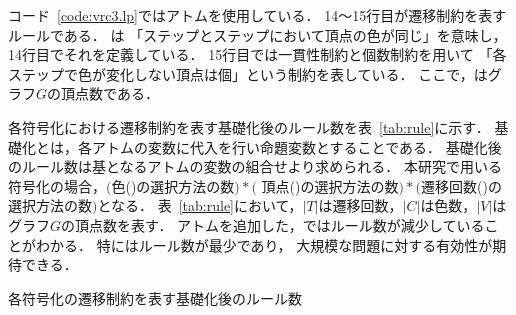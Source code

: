 コード~\ref{code:vrc3.lp}ではアトムを使用している．
14～15行目が遷移制約を表すルールである．
は
「ステップとステップにおいて頂点の色が同じ」を意味し，
14行目でそれを定義している．
15行目では一貫性制約と個数制約を用いて
「各ステップで色が変化しない頂点は個」という制約を表している．
ここで，はグラフ$G$の頂点数である．

各符号化における遷移制約を表す基礎化後のルール数を表~\ref{tab:rule}に示す．
基礎化とは，各アトムの変数に代入を行い命題変数とすることである．
基礎化後のルール数は基となるアトムの変数の組合せより求められる．
本研究で用いる符号化の場合，$($色()の選択方法の数$)*($
頂点()の選択方法の数$)*($遷移回数()の選択方法の数$)$となる．
表~\ref{tab:rule}において，$|T|$は遷移回数，$|C|$は色数，$|V|$はグラフ$G$の頂点数を表す．
アトムを追加した，ではルール数が減少していることがわかる．
特にはルール数が最少であり，
大規模な問題に対する有効性が期待できる．

\begin{table}[tb]
  \centering
  \caption{各符号化の遷移制約を表す基礎化後のルール数}
  
  \label{tab:rule}
\end{table}


